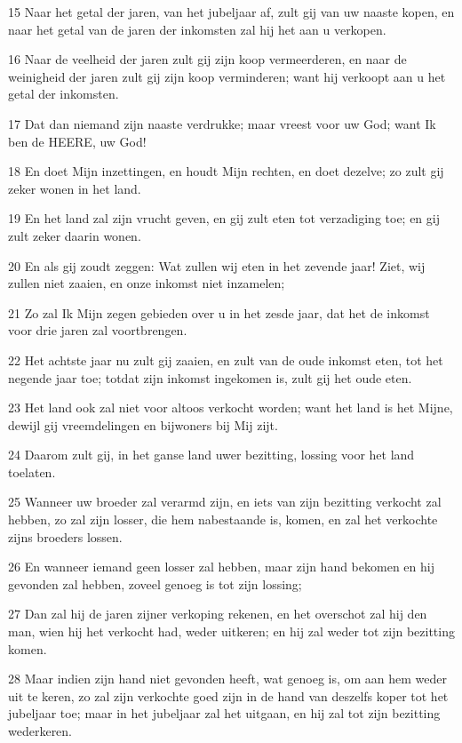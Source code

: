 \par 15 Naar het getal der jaren, van het jubeljaar af, zult gij van uw naaste kopen, en naar het getal van de jaren der inkomsten zal hij het aan u verkopen.
\par 16 Naar de veelheid der jaren zult gij zijn koop vermeerderen, en naar de weinigheid der jaren zult gij zijn koop verminderen; want hij verkoopt aan u het getal der inkomsten.
\par 17 Dat dan niemand zijn naaste verdrukke; maar vreest voor uw God; want Ik ben de HEERE, uw God!
\par 18 En doet Mijn inzettingen, en houdt Mijn rechten, en doet dezelve; zo zult gij zeker wonen in het land.
\par 19 En het land zal zijn vrucht geven, en gij zult eten tot verzadiging toe; en gij zult zeker daarin wonen.
\par 20 En als gij zoudt zeggen: Wat zullen wij eten in het zevende jaar! Ziet, wij zullen niet zaaien, en onze inkomst niet inzamelen;
\par 21 Zo zal Ik Mijn zegen gebieden over u in het zesde jaar, dat het de inkomst voor drie jaren zal voortbrengen.
\par 22 Het achtste jaar nu zult gij zaaien, en zult van de oude inkomst eten, tot het negende jaar toe; totdat zijn inkomst ingekomen is, zult gij het oude eten.
\par 23 Het land ook zal niet voor altoos verkocht worden; want het land is het Mijne, dewijl gij vreemdelingen en bijwoners bij Mij zijt.
\par 24 Daarom zult gij, in het ganse land uwer bezitting, lossing voor het land toelaten.
\par 25 Wanneer uw broeder zal verarmd zijn, en iets van zijn bezitting verkocht zal hebben, zo zal zijn losser, die hem nabestaande is, komen, en zal het verkochte zijns broeders lossen.
\par 26 En wanneer iemand geen losser zal hebben, maar zijn hand bekomen en hij gevonden zal hebben, zoveel genoeg is tot zijn lossing;
\par 27 Dan zal hij de jaren zijner verkoping rekenen, en het overschot zal hij den man, wien hij het verkocht had, weder uitkeren; en hij zal weder tot zijn bezitting komen.
\par 28 Maar indien zijn hand niet gevonden heeft, wat genoeg is, om aan hem weder uit te keren, zo zal zijn verkochte goed zijn in de hand van deszelfs koper tot het jubeljaar toe; maar in het jubeljaar zal het uitgaan, en hij zal tot zijn bezitting wederkeren.
